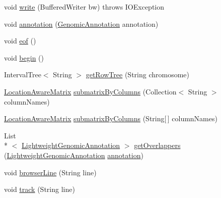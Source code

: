 \begin{DoxyCompactItemize}
\item 
void \hyperlink{classbroad_1_1pda_1_1datastructures_1_1_location_aware_matrix_a4a2728e07b64a966059ee4f0d5d9fc63}{write} (Buffered\+Writer bw)  throws I\+O\+Exception 
\item 
void \hyperlink{classbroad_1_1pda_1_1datastructures_1_1_location_aware_matrix_ab12829b4bec6392f73ef867a924dd00b}{annotation} (\hyperlink{interfacebroad_1_1core_1_1annotation_1_1_genomic_annotation}{Genomic\+Annotation} annotation)
\item 
void \hyperlink{classbroad_1_1pda_1_1datastructures_1_1_location_aware_matrix_ad5813dfaedf6c8b06b481a5af85ff940}{eof} ()
\item 
void \hyperlink{classbroad_1_1pda_1_1datastructures_1_1_location_aware_matrix_aa823b3fd04acecf9315f1764f4cd52e7}{begin} ()
\item 
Interval\+Tree$<$ String $>$ \hyperlink{classbroad_1_1pda_1_1datastructures_1_1_location_aware_matrix_a74078bbee72db894231be70f8a2fd8b2}{get\+Row\+Tree} (String chromosome)
\item 
\hyperlink{classbroad_1_1pda_1_1datastructures_1_1_location_aware_matrix}{Location\+Aware\+Matrix} \hyperlink{classbroad_1_1pda_1_1datastructures_1_1_location_aware_matrix_ae64885db621cdb9db40bc334cc3de48e}{submatrix\+By\+Columns} (Collection$<$ String $>$ column\+Names)
\item 
\hyperlink{classbroad_1_1pda_1_1datastructures_1_1_location_aware_matrix}{Location\+Aware\+Matrix} \hyperlink{classbroad_1_1pda_1_1datastructures_1_1_location_aware_matrix_a7f4a047ce0579d3ed840c0395cb54baf}{submatrix\+By\+Columns} (String\mbox{[}$\,$\mbox{]} column\+Names)
\item 
List\\*
$<$ \hyperlink{interfacebroad_1_1core_1_1annotation_1_1_lightweight_genomic_annotation}{Lightweight\+Genomic\+Annotation} $>$ \hyperlink{classbroad_1_1pda_1_1datastructures_1_1_location_aware_matrix_a1a3c6c34c6d39eb5b262362d46a3521d}{get\+Overlappers} (\hyperlink{interfacebroad_1_1core_1_1annotation_1_1_lightweight_genomic_annotation}{Lightweight\+Genomic\+Annotation} \hyperlink{classbroad_1_1pda_1_1datastructures_1_1_location_aware_matrix_ab12829b4bec6392f73ef867a924dd00b}{annotation})
\item 
void \hyperlink{classbroad_1_1pda_1_1datastructures_1_1_location_aware_matrix_a54407bb5f647d3ded8be0a4909e42687}{browser\+Line} (String line)
\item 
void \hyperlink{classbroad_1_1pda_1_1datastructures_1_1_location_aware_matrix_ae6e639204be24573bd8b5bb2c98f4eea}{track} (String line)

\end{DoxyCompactItemize}
